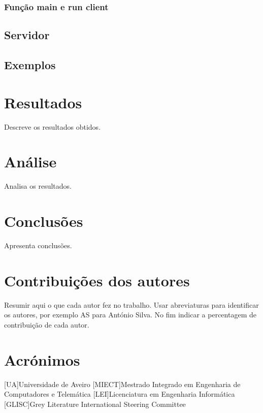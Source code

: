 \documentclass{report}
\begin{document}
\subsection{Função main e run client}


\section{Servidor}


\section{Exemplos}


\chapter{Resultados}
\label{chap.resultados}
Descreve os resultados obtidos.

\chapter{Análise}
\label{chap.analise}
Analisa os resultados.

\chapter{Conclusões}
\label{chap.conclusao}
Apresenta conclusões.

\chapter*{Contribuições dos autores}
Resumir aqui o que cada autor fez no trabalho.
Usar abreviaturas para identificar os autores,
por exemplo AS para António Silva.
No fim indicar a percentagem de contribuição de cada autor.

\chapter*{Acrónimos}
\begin{acronym}
[UA]{Universidade de Aveiro}
[MIECT]{Mestrado Integrado em Engenharia de Computadores e Telemática}
[LEI]{Licenciatura em Engenharia Informática}
[GLISC]{Grey Literature International Steering Committee}
\end{acronym}


\printbibliography
\end{document}
